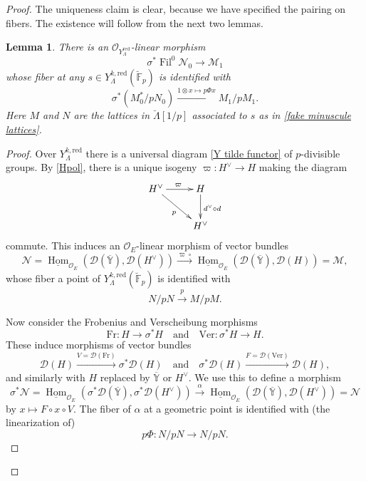 \documentclass[10pt,a4paper]{amsart}
\newtheorem{lemma}{Lemma}
\newcommand{\F}{\mathbb F}
\DeclareMathOperator{\Fil}{Fil}
\DeclareMathOperator{\Hom}{Hom}
\newcommand{\co}{\mathcal O}
\newcommand{\map}[1]{\xrightarrow{#1}}
\newcommand{\red}{\mathrm{red}}
\begin{document}
\begin{proof}
The uniqueness claim is clear, because we have specified the pairing on fibers.  The existence will follow from the next two lemmas.






\begin{lemma}\label{lem:goof map}
There is an $\co_{Y^\red_\Lambda}$-linear morphism
\[
\sigma^* \Fil^0 \mathscr{N}_0 \to \mathscr{M}_1
\]
whose fiber at any $s\in Y^{k,\red}_\Lambda(\breve{\F}_p)$ is identified with 
\[
 \sigma^* (   M_0^* /  p N_0  )  \map{ 1 \otimes x \mapsto p \Phi x }  M_1 / pM_1  .
\]
Here $M$ and $N$ are the lattices in $\breve{\Lambda}[1/p]$ associated to  $s$ as in \eqref{fake minuscule lattices}.
\end{lemma}

\begin{proof}
Over $Y^{k,\red}_\Lambda$ there is a universal diagram \eqref{Y tilde functor} of $p$-divisible groups.
By \eqref{Hpol}, there is a unique isogeny  $\varpi : H^\vee \to H$  making the diagram 
\[
\xymatrix{
{H^\vee}  \ar[dr]_p  \ar[r]^{\varpi}  & { H  }  \ar[d]^{ d^\vee \circ d}  \\
{    }   &  {   H^\vee  } 
}
\]
commute. This induces an $\co_E$-linear morphism of vector bundles
\[
  \mathscr{N}= \underline{\Hom}_{\co_E}  ( \mathscr{D}(\overline{\mathbb{Y}} ) , \mathscr{D}(H^\vee)  )
  \map{  \varpi  \circ }
   \underline{\Hom}_{\co_E}  ( \mathscr{D}(\overline{\mathbb{Y}} ) , \mathscr{D}(H)  )
   = \mathscr{M},
\]
whose fiber a point of $Y^{k,\red}_\Lambda(\breve{\F}_p)$ is identified with
\[
N / pN \map{p }  M/pM .
\]

Now consider the Frobenius   and Verscheibung morphisms
\[
\mathrm{Fr} :  H \to \sigma^*H
\quad \mbox{and}\quad \mathrm{Ver} : \sigma^* H\to H .
\]
These induce morphisms of vector bundles
\[
 \mathscr{D}( H) \map{ V=\mathscr{D}(  \mathrm{Fr})  }  \sigma^*  \mathscr{D}( H )
 \quad \mbox{and}\quad 
 \sigma^* \mathscr{D}( H ) \map{ F=\mathscr{D}(  \mathrm{Ver})  }   \mathscr{D}( H ),
\]
and similarly with $H$ replaced by $\overline{\mathbb{Y}}$ or $H^\vee$.  
We use this to define a morphism 
\[
\sigma^* \mathscr{N} = 
 \underline{\Hom}_{\co_E} ( \sigma^*\mathscr{D}(\overline{\mathbb{Y}} ) , \sigma^* \mathscr{D}(H^\vee)  ) 
 \map{\alpha}
  \underline{\Hom}_{\co_E}  ( \mathscr{D}(\overline{\mathbb{Y}} )  , \mathscr{D}(H^\vee) )
  = \mathscr{N}
\]
by $x \mapsto  F \circ x \circ V$.
The   fiber of $\alpha$ at a geometric point is identified with (the linearization of)
\[
p\Phi :  N  /pN  \to N / pN.
\]



\end{proof}
\end{proof}
\end{document}
